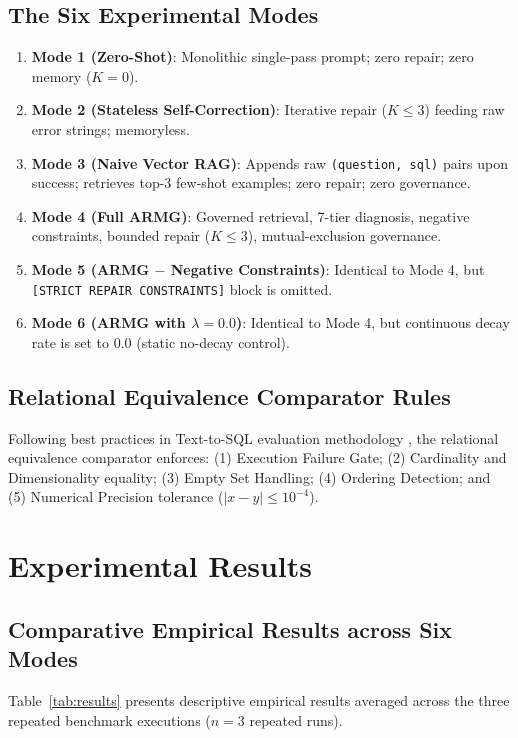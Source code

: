 \subsection{The Six Experimental Modes}
\begin{enumerate}
    \item \textbf{Mode 1 (Zero-Shot)}: Monolithic single-pass prompt; zero repair; zero memory ($K=0$).
    \item \textbf{Mode 2 (Stateless Self-Correction)}: Iterative repair ($K \le 3$) feeding raw error strings; memoryless.
    \item \textbf{Mode 3 (Naive Vector RAG)}: Appends raw \texttt{(question, sql)} pairs upon success; retrieves top-3 few-shot examples; zero repair; zero governance.
    \item \textbf{Mode 4 (Full ARMG)}: Governed retrieval, 7-tier diagnosis, negative constraints, bounded repair ($K \le 3$), mutual-exclusion governance.
    \item \textbf{Mode 5 (ARMG $-$ Negative Constraints)}: Identical to Mode 4, but \texttt{[STRICT\allowbreak{} REPAIR\allowbreak{} CONSTRAINTS]} block is omitted.
    \item \textbf{Mode 6 (ARMG with $\lambda = 0.0$)}: Identical to Mode 4, but continuous decay rate is set to 0.0 (static no-decay control).
\end{enumerate}

\subsection{Relational Equivalence Comparator Rules}
Following best practices in Text-to-SQL evaluation methodology \cite{finegandollak2018eval, zhong2020distilled}, the relational equivalence comparator enforces: (1) Execution Failure Gate; (2) Cardinality and Dimensionality equality; (3) Empty Set Handling; (4) Ordering Detection; and (5) Numerical Precision tolerance ($\vert{}x - y\vert{} \le 10^{-4}$).

\section{Experimental Results}

\subsection{Comparative Empirical Results across Six Modes}
Table~\ref{tab:results} presents descriptive empirical results averaged across the three repeated benchmark executions ($n = 3$ repeated runs).

